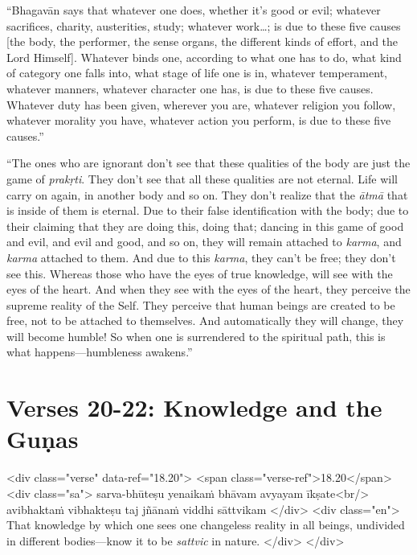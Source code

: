 \enquote{Bhagavān says that whatever one does, whether it’s good or evil; whatever sacrifices, charity, austerities, study; whatever work\ldots; is due to these five causes [the body, the performer, the sense organs, the different kinds of effort, and the Lord Himself]. Whatever binds one, according to what one has to do, what kind of category one falls into, what stage of life one is in, whatever temperament, whatever manners, whatever character one has, is due to these five causes. Whatever duty has been given, wherever you are, whatever religion you follow, whatever morality you have, whatever action you perform, is due to these five causes.}

\enquote{The ones who are ignorant don’t see that these qualities of the body are just the game of \textit{prakṛti}. They don’t see that all these qualities are not eternal. Life will carry on again, in another body and so on. They don’t realize that the \textit{ātmā} that is inside of them is eternal. Due to their false identification with the body; due to their claiming that they are doing this, doing that; dancing in this game of good and evil, and evil and good, and so on, they will remain attached to \textit{karma}, and \textit{karma} attached to them. And due to this \textit{karma}, they can’t be free; they don’t see this. Whereas those who have the eyes of true knowledge, will see with the eyes of the heart. And when they see with the eyes of the heart, they perceive the supreme reality of the Self. They perceive that human beings are created to be free, not to be attached to themselves. And automatically they will change, they will become humble! So when one is surrendered to the spiritual path, this is what happens---humbleness awakens.}

\section{Verses 20-22: Knowledge and the Guṇas}\label{sec-verses-20-22-knowledge-and-the-gunas}


\begin{html}
<div class="verse" data-ref="18.20">
  <span class="verse-ref">18.20</span>
  <div class="sa">
    sarva-bhūteṣu yenaikaṁ bhāvam avyayam īkṣate<br/>
    avibhaktaṁ vibhakteṣu taj jñānaṁ viddhi sāttvikam
  </div>
  <div class="en">
    That knowledge by which one sees one changeless reality in all beings, undivided in different bodies---know it to be \textit{sattvic} in nature.
  </div>
</div>
\end{html}



